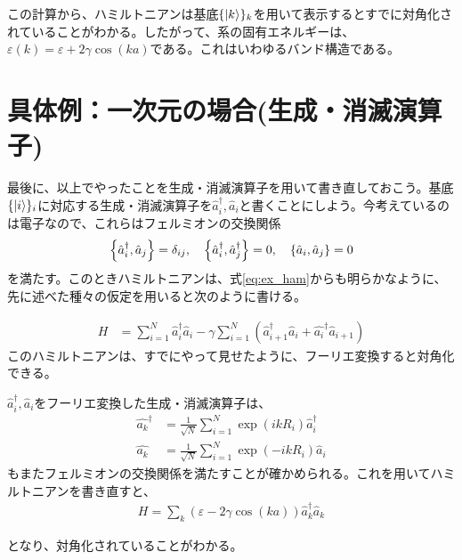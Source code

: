 \documentclass[uplatex,dvipdfmx]{jsarticle}
\newcommand{\crt}[1]{\hat{#1}^\dagger}
\newcommand{\anh}[1]{\hat{#1}}
\begin{document}
    この計算から、ハミルトニアンは基底$\{\ket{k}\}_{k}$を用いて表示するとすでに対角化されていることがわかる。したがって、系の固有エネルギーは、$\varepsilon(k) = \varepsilon + 2\gamma \cos(ka)$である。これはいわゆるバンド構造である。

    \section{具体例：一次元の場合(生成・消滅演算子)}
    最後に、以上でやったことを生成・消滅演算子を用いて書き直しておこう。基底$\{\ket{i}\}_{i}$に対応する生成・消滅演算子を$\crt{a}_i, \anh{a}_i$と書くことにしよう。今考えているのは電子なので、これらはフェルミオンの交換関係
    \begin{align}
        \acomm{\crt{a}_i}{\anh{a}_j} = \delta_{ij}, \quad 
        \acomm{\crt{a}_i}{\crt{a}_j} = 0 , \quad \acomm{\anh{a}_i}{\anh{a}_j} = 0        
    \end{align}
    を満たす。このときハミルトニアンは、式\ref{eq:ex_ham}からも明らかなように、先に述べた種々の仮定を用いると次のように書ける。
    
    \begin{align}
        H &= \sum_{i=1}^N \crt{a}_i\anh{a}_i -\gamma \sum_{i=1}^N \left(\crt{a}_{i+1}\anh{a}_{i} + \crt{a_{i}}\anh{a}_{i+1} \right)
    \end{align}
    このハミルトニアンは、すでにやって見せたように、フーリエ変換すると対角化できる。

    $\crt{a}_i, \anh{a}_i$をフーリエ変換した生成・消滅演算子は、
    \begin{align}
        \crt{a_k} &= \frac{1}{\sqrt{N}} \sum_{i=1}^N \exp(ikR_i)\crt{a}_i \\
        \anh{a_k} &= \frac{1}{\sqrt{N}} \sum_{i=1}^N \exp(-ikR_i)\anh{a}_i        
    \end{align}
    もまたフェルミオンの交換関係を満たすことが確かめられる。これを用いてハミルトニアンを書き直すと、
    \begin{align}
        H = \sum_k \left(\varepsilon-2\gamma \cos(ka) \right)\crt{a}_k \anh{a}_k
    \end{align}

    となり、対角化されていることがわかる。
\end{document}
